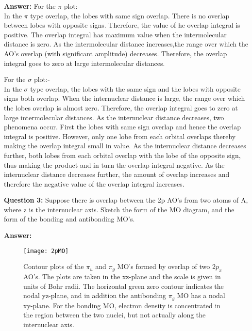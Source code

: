 \documentclass[12pt]{article}
\begin{document}
	\textbf{Answer: }For the $\pi$ plot:-\\
	In the $\pi$ type overlap, the lobes with same sign overlap. There is no overlap between lobes with opposite signs. Therefore, the value of he overlap integral is positive. The overlap integral has maximum value when the intermolecular distance is zero. As the intermolecular distance increases,the range over which the AO's overlap (with significant amplitude) decreases. Therefore, the overlap integral goes to zero at large intermolecular distances.
	
	For the $\sigma$ plot:-\\
	In the $\sigma$ type overlap, the lobes with the same sign and the lobes with opposite signs both overlap. When the internuclear distance is large, the range over which the lobes overlap is almost zero. Therefore, the overlap integral goes to zero at large intermolecular distances. As the internuclear distance decreases, two phenomena occur. First the lobes with same sign overlap and hence the overlap integral is positive. However, only one lobe from each orbital overlaps thereby making the overlap integral small in value. As the internuclear distance decreases further, both lobes from each orbital overlap with the lobe of the opposite sign, thus making the product and in turn the overlap integral negative. As the internuclear distance decreases further, the amount of overlap increases and therefore the negative value of the overlap integral increases.
	
	\textbf{Question 3: }Suppose there is overlap between the 2p AO’s from two atoms of A, where z is the 
	internuclear axis. Sketch the form of the MO diagram, and the form of the bonding and 
	antibonding MO’s.
	
	\textbf{Answer: }
	
	\begin{figure}[H]
		\centering
		\texttt{[image: 2pMO]}
		\caption{Contour plots of the $\pi_{u}$
			and $\pi_{g}$ MO's formed by overlap of
			two $2p_{x}$ AO's. The plots are taken
			in the xz-plane and the scale is
			given in units of Bohr radii. The
			horizontal green zero contour
			indicates the nodal yz-plane, and
			in addition the antibonding $\pi_{g}$
			MO has a nodal xy-plane. For the
			bonding MO, electron density is
			concentrated in the region between
			the two nuclei, but not actually
			along the internuclear axis.}
		\label{figure:2pMO}
	\end{figure}

\pagebreak
\end{document}
